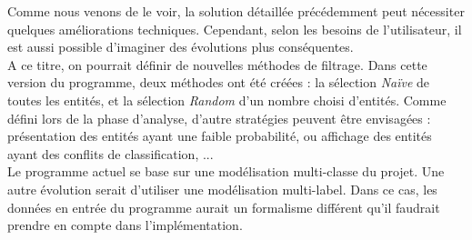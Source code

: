 Comme nous venons de le voir, la solution détaillée précédemment peut nécessiter quelques améliorations techniques. Cependant, selon les besoins de l'utilisateur, il est aussi possible d'imaginer des évolutions plus conséquentes.\\

A ce titre, on pourrait définir de nouvelles méthodes de filtrage. Dans cette version du programme, deux méthodes ont été créées : la sélection \textit{Naïve} de toutes les entités, et la sélection \textit{Random} d'un nombre choisi d'entités. Comme défini lors de la phase d'analyse, d'autre stratégies peuvent être envisagées : présentation des entités ayant une faible probabilité, ou affichage des entités ayant des conflits de classification, ... \\

Le programme actuel se base sur une modélisation multi-classe du projet. Une autre évolution serait d'utiliser une modélisation multi-label. Dans ce cas, les données en entrée du programme aurait un formalisme différent qu'il faudrait prendre en compte dans l'implémentation.
